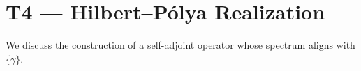 \section{T4 --- Hilbert--P\'olya Realization}
We discuss the construction of a self-adjoint operator whose spectrum aligns with $\{\gamma\}$.
